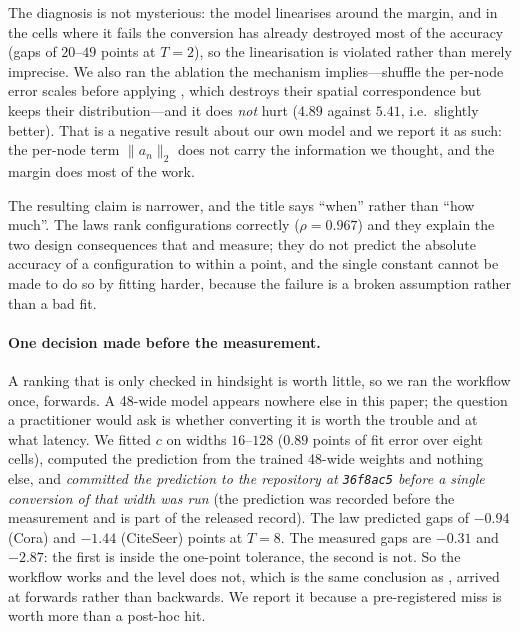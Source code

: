 The diagnosis is not mysterious: the model linearises around the margin, and in the cells where it
fails the conversion has already destroyed most of the accuracy (gaps of $20$--$49$ points at $T=2$),
so the linearisation is violated rather than merely imprecise. We also ran the ablation the mechanism
implies---shuffle the per-node error scales before applying , which destroys their
spatial correspondence but keeps their distribution---and it does \emph{not} hurt ($4.89$ against
$5.41$, i.e.\ slightly better). That is a negative result about our own model and we report it as
such: the per-node term $\lVert a_{n}\rVert_{2}$ does not carry the information we thought, and the
margin does most of the work.

The resulting claim is narrower, and the title says ``when'' rather
than ``how much''. The laws rank configurations correctly ($\rho=0.967$) and they explain the two
design consequences that  and  measure; they do not predict the
absolute accuracy of a configuration to within a point, and the single constant cannot be made to do
so by fitting harder, because the failure is a broken assumption rather than a bad fit.

\paragraph{One decision made before the measurement.} A ranking that is only checked in hindsight is
worth little, so we ran the workflow once, forwards. A 48-wide model appears nowhere else in this
paper; the question a practitioner would ask is whether converting it is worth the trouble and at
what latency. We fitted $c$ on widths $16$--$128$ ($0.89$ points of fit error over eight cells),
computed the prediction from the trained 48-wide weights and nothing else, and \emph{committed the
prediction to the repository at \texttt{36f8ac5} before a single conversion of that width was run}
(the prediction was recorded before the measurement and is part of the released record). The law
predicted gaps of $-0.94$ (Cora) and $-1.44$ (CiteSeer) points at $T=8$. The measured gaps are
$-0.31$ and $-2.87$: the first is inside the one-point tolerance, the second is not. So the workflow
works and the level does not, which is the same conclusion as , arrived at
forwards rather than backwards. We report it because a pre-registered miss is worth more than a
post-hoc hit.



